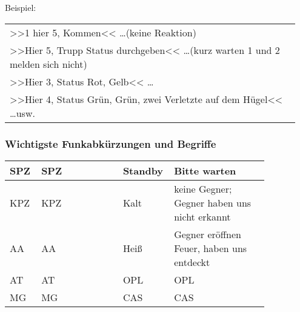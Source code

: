 	Beispiel:\\
	\begin{longtable}{P{0.95\linewidth}}
	\toprule
	>>1 hier 5, Kommen<< \dots (keine Reaktion)\\  
	>>Hier 5, Trupp Status durchgeben<< \dots (kurz warten 1 und 2 melden sich nicht)\\ 
	\rcg >>Hier 3, Status Rot, Gelb<< \dots\\ 
	\rcgg >>Hier 4, Status Grün, Grün, zwei Verletzte auf dem Hügel<< \dots usw.\\
	\bottomrule
	\end{longtable}		

\subsubsection{Wichtigste Funkabkürzungen und Begriffe}
	\begin{longtable}{p{0.1\linewidth}p{0.25\linewidth}p{0.05\linewidth}p{0.1\linewidth}p{0.35\linewidth}} 
		\toprule
		\acs{SPZ}	& \acl{SPZ}	&& Standby	& Bitte warten \hfil\\ 
		\midrule
		\acs{KPZ}	& \acl{KPZ}	&& Kalt		& keine Gegner; Gegner haben uns nicht erkannt\\ 
		\acs{AA}	& \acl{AA}	&& Heiß 		& Gegner eröffnen Feuer, haben uns entdeckt \\ 
		\acs{AT}	& \acl{AT}	&& \acs{OPL}	& \acl{OPL} \\ 
		\acs{MG}	& \acl{MG}	&& \acs{CAS}	& \acl{CAS} \\ 
		\bottomrule
	\end{longtable}



